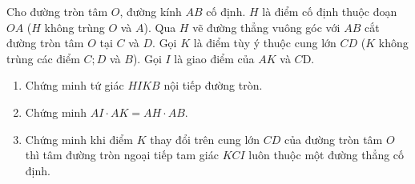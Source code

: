 \begin{bt}%
	Cho đường tròn tâm $O$, đường kính $AB$ cố định. $H$ là điểm cố định thuộc đoạn $OA$ ($H$ không trùng $O$ và $A$). Qua $H$ vẽ đường thẳng vuông góc với $AB$ cắt đường tròn tâm $O$ tại $C$ và $D$. Gọi $K$ là điểm tùy ý thuộc cung lớn $CD$ 
	($K$ không trùng các điểm $C;D$ và $B$). Gọi $I$ là giao điểm của $AK$ và $C\text{D}$.
	\begin{enumerate}
		\item Chứng minh tứ giác $HIKB$ nội tiếp đường tròn.
		\item Chứng minh $AI\cdot AK=AH\cdot AB.$
		\item Chứng minh khi điểm $K$ thay đổi trên cung lớn $CD$ của đường tròn tâm $O$ thì tâm đường tròn ngoại tiếp tam giác  $KCI$ luôn thuộc một đường thẳng cố định.
	\end{enumerate}
\end{bt}
